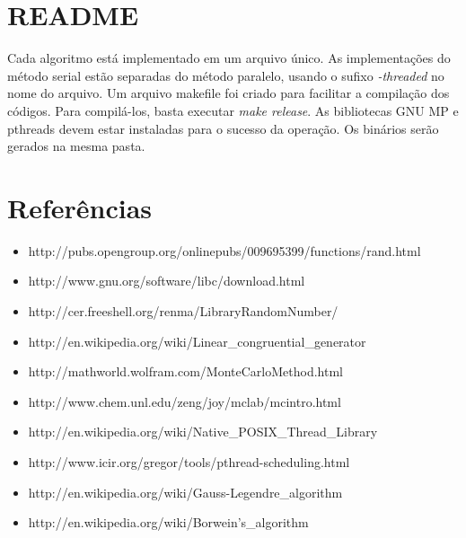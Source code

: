 \documentclass[a4paper]{article}
\begin{document}
\section{README}
Cada algoritmo está implementado em um arquivo único. As implementações do método
serial estão separadas do método paralelo, usando o sufixo \emph{-threaded} no nome do arquivo.
Um arquivo makefile foi criado para facilitar a compilação dos códigos. Para compilá-los,
basta executar \emph{make release}. As bibliotecas GNU MP e pthreads devem estar
instaladas para o sucesso da operação. Os binários serão gerados na mesma pasta.

\section{Referências}
\begin{itemize}
\item http://pubs.opengroup.org/onlinepubs/009695399/functions/rand.html
\item http://www.gnu.org/software/libc/download.html
\item http://cer.freeshell.org/renma/LibraryRandomNumber/
\item http://en.wikipedia.org/wiki/Linear\_congruential\_generator
\item http://mathworld.wolfram.com/MonteCarloMethod.html
\item http://www.chem.unl.edu/zeng/joy/mclab/mcintro.html
\item http://en.wikipedia.org/wiki/Native\_POSIX\_Thread\_Library
\item http://www.icir.org/gregor/tools/pthread-scheduling.html
\item http://en.wikipedia.org/wiki/Gauss-Legendre\_algorithm
\item http://en.wikipedia.org/wiki/Borwein's\_algorithm
\end{itemize}
\end{document}
